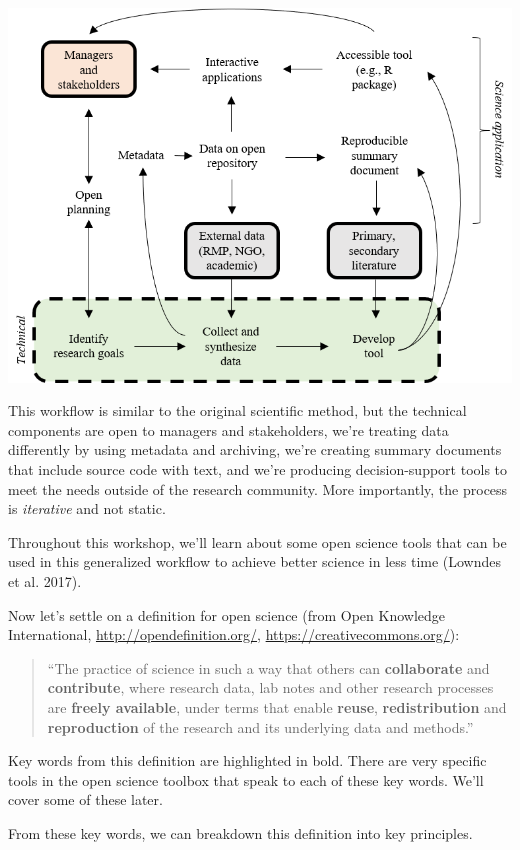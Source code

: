 \documentclass[
  letterpaper,
  DIV=11,
  numbers=noendperiod]{scrreprt}
\begin{document}
\includegraphics{./img/open.png}

This workflow is similar to the original scientific method, but the
technical components are open to managers and stakeholders, we're
treating data differently by using metadata and archiving, we're
creating summary documents that include source code with text, and we're
producing decision-support tools to meet the needs outside of the
research community. More importantly, the process is \emph{iterative}
and not static.

Throughout this workshop, we'll learn about some open science tools that
can be used in this generalized workflow to achieve better science in
less time (Lowndes et al. 2017).

Now let's settle on a definition for open science (from Open Knowledge
International, \url{http://opendefinition.org/},
\url{https://creativecommons.org/}):

\begin{quote}
``The practice of science in such a way that others can
\textbf{collaborate} and \textbf{contribute}, where research data, lab
notes and other research processes are \textbf{freely available}, under
terms that enable \textbf{reuse}, \textbf{redistribution} and
\textbf{reproduction} of the research and its underlying data and
methods.''
\end{quote}

Key words from this definition are highlighted in bold. There are very
specific tools in the open science toolbox that speak to each of these
key words. We'll cover some of these later.

From these key words, we can breakdown this definition into key
principles.
\end{document}

